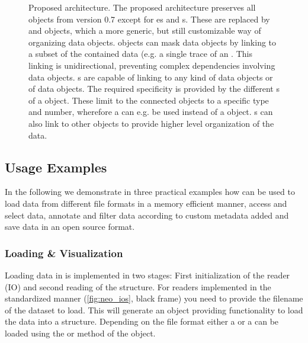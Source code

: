 \begin{figure}
    \centering
    
    \caption[Proposed  architecture]{Proposed  architecture. The proposed  architecture preserves all objects from  version 0.7 except for es and s. These are replaced by  and  objects, which a more generic, but still customizable way of organizing data objects.  objects can mask data objects by linking to a subset of the contained data (e.g. a single trace of an . This linking is unidirectional, preventing complex dependencies involving data objects. s are capable of linking to any kind of data objects or  of data objects. The required specificity is provided by the different s of a  object. These limit to the connected objects to a specific type and number, wherefore a  can e.g. be used instead of a  object. s can also link to other  objects to provide higher level organization of the data.}
    \label{fig:neo_architecture_future}
\end{figure}


\subsection{ Usage Examples}
In the following we demonstrate in three practical examples how  can be used to load data from different file formats in a memory efficient manner, access and select data, annotate and filter data according to custom metadata added and save data in an open source format.

\subsubsection{Loading \& Visualization}
Loading data in  is implemented in two stages: First initialization of the reader (IO) and second reading of the  structure. For readers implemented in the standardized manner (\cref{fig:neo_ios}, black frame) you need to provide the filename of the dataset to load. This will generate an  object providing functionality to load the data into a  structure. Depending on the file format either a   or a   can be loaded using the  or  method of the  object.

